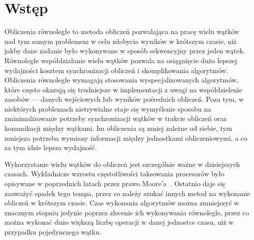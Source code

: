 \documentclass[a4paper,11pt,twoside]{report}
\theoremstyle{definition}
\begin{document}
\thispagestyle{empty}
\newpage

\null\thispagestyle{empty}\newpage


\tableofcontents
\thispagestyle{empty}

\newpage %

\null\thispagestyle{empty}\newpage
\pagestyle{fancy}
\setcounter{page}{11} %

\chapter{Wstęp}

    Obliczenia równoległe to metoda obliczeń pozwalająca na pracę wielu wątków nad tym samym problemem w celu zdobycia wyników w krótszym czasie, niż jakby dane zadanie było wykonywane w sposób sekwencyjny przez jeden wątek.
    Równoległe współdziałanie wielu wątków pozwala na osiągnięcie dużo lepszej wydajności
    kosztem synchronizacji obliczeń i skomplikowania algorytmów.
    Obliczenia równoległe wymagają stosowania wyspecjalizowanych algorytmów, które często okazują się
    trudniejsze w implementacji z uwagi na współdzielenie zasobów --- danych wejściowych lub
    wyników pośrednich obliczeń.
    Poza tym, w niektórych problemach nietrywialne staje się wymyślenie sposobu na
    zminimalizowanie potrzeby synchronizacji wątków w trakcie obliczeń
    oraz komunikacji między wątkami. Im obliczenia są mniej zależne od siebie,
    tym mniejsza potrzeba wymiany informacji między jednostkami obliczeniowymi, a co za tym idzie lepsza wydajność.
    
    Wykorzystanie wielu wątków do obliczeń jest szczególnie ważne w dzisiejszych czasach.
    Wykładnicze wzrostu częstotliwości taksowania procesorów było
    opisywane w poprzednich latach przez prawo Moore'a~\cite{prawo-moorea}.
    Ostatnio daje się zauważyć spadek tego tempa, przez co należy szukać innych metod na wykonanie obliczeń w krótszym czasie.
    Czas wykonania algorytmów można zmniejszyć w znacznym stopniu jedynie poprzez zlecenie ich wykonywania równolegle,
    przez co można wykonać dużo większą liczbę operacji w danej jednostce czasu,
    niż w przypadku pojedynczego wątku.
\end{document}
